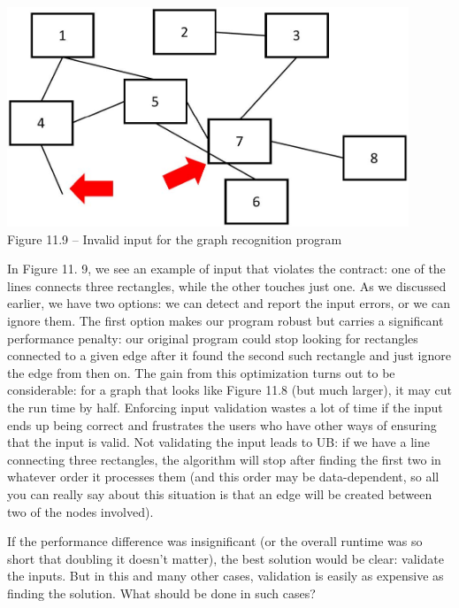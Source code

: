 \hspace*{\fill} \\ %
\begin{center}
\includegraphics[width=0.9\textwidth]{content/3/chapter11/images/9.jpg}\\
Figure 11.9 – Invalid input for the graph recognition program
\end{center}

In Figure 11. 9, we see an example of input that violates the contract: one of the lines connects three rectangles, while the other touches just one. As we discussed earlier, we have two options: we can detect and report the input errors, or we can ignore them. The first option makes our program robust but carries a significant performance penalty: our original program could stop looking for rectangles connected to a given edge after it found the second such rectangle and just ignore the edge from then on. The gain from this optimization turns out to be considerable: for a graph that looks like Figure 11.8 (but much larger), it may cut the run time by half. Enforcing input validation wastes a lot of time if the input ends up being correct and frustrates the users who have other ways of ensuring that the input is valid. Not validating the input leads to UB: if we have a line connecting three rectangles, the algorithm will stop after finding the first two in whatever order it processes them (and this order may be data-dependent, so all you can really say about this situation is that an edge will be created between two of the nodes involved).

If the performance difference was insignificant (or the overall runtime was so short that doubling it doesn't matter), the best solution would be clear: validate the inputs. But in this and many other cases, validation is easily as expensive as finding the solution. What should be done in such cases?

